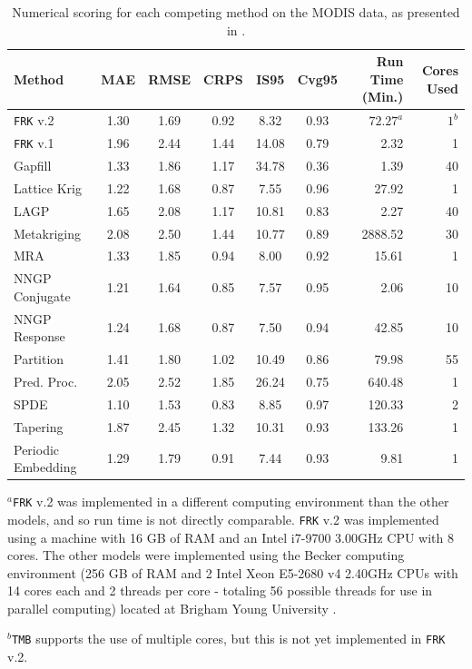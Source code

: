 \documentclass[12pt,a4paper]{article}
\newenvironment{tabnote}{\par\vspace{1mm}\footnotesize}{\par}
\begin{document}
\begin{table}[t!]
    \begin{center}
    \setlength{\tabcolsep}{5pt}
    \caption{Numerical scoring for each competing method on the MODIS data, as presented in \cite{Heaton_2019_comparative_study}.}
    \label{tab:Heaton_comparison}
    \begin{tabular}{lcccccrr}
    \hline
    \hline
    Method & MAE  & RMSE & CRPS & IS95 & Cvg95 & Run Time (Min.) & Cores Used \\[0pt]
    \hline
    \texttt{FRK} v.2 & 1.30  & 1.69 & 0.92  & 8.32 & 0.93 & $72.27^{a}$ & $1^{b}$    \\[0pt]
    \texttt{FRK} v.1 & 1.96   & 2.44 & 1.44  & 14.08 & 0.79 & 2.32 & 1\\[0pt]
    Gapfill & 1.33   & 1.86 & 1.17  & 34.78 & 0.36 & 1.39 & 40\\[0pt]
    Lattice Krig & 1.22   & 1.68 & 0.87  & 7.55 & 0.96 & 27.92 & 1\\[0pt]
    LAGP & 1.65   & 2.08 & 1.17  & 10.81 & 0.83 & 2.27 & 40\\[0pt]
    Metakriging  & 2.08 & 2.50  & 1.44 & 10.77 & 0.89 & 2888.52 & 30\\[0pt]
     MRA & 1.33 & 1.85 & 0.94 & 8.00 & 0.92 & 15.61 & 1\\[0pt]
    NNGP Conjugate & 1.21 & 1.64 & 0.85 & 7.57 & 0.95 & 2.06 & 10\\[0pt]
    NNGP Response & 1.24 & 1.68 & 0.87 & 7.50 & 0.94 & 42.85 & 10\\[0pt]
    Partition & 1.41 & 1.80 & 1.02 & 10.49 & 0.86 & 79.98 & 55 \\[0pt]
    Pred. Proc. & 2.05 & 2.52 & 1.85 & 26.24 & 0.75 & 640.48 & 1\\[0pt]
    SPDE & 1.10 & 1.53 & 0.83 & 8.85 & 0.97 & 120.33 & 2\\[0pt]
    Tapering & 1.87 & 2.45 & 1.32 & 10.31 & 0.93 & 133.26 & 1\\[0pt]
    Periodic Embedding & 1.29 & 1.79 & 0.91 & 7.44 & 0.93 & 9.81 & 1\\[0pt]
    \hline
    \hline
    \end{tabular}
    \end{center}
    \begin{tabnote}
$^{a}$\texttt{FRK} v.2 was implemented in a different computing environment than the other models, and so run time is not directly comparable. \texttt{FRK} v.2 was implemented using a machine with 16 GB of RAM and an Intel i7-9700 3.00GHz CPU with 8 cores. The other models were implemented using the Becker computing environment (256 GB of RAM and 2 Intel Xeon E5-2680 v4 2.40GHz CPUs with 14 cores each and 2 threads per core - totaling 56 possible threads for use in parallel computing) located at Brigham Young University \citep{Heaton_2019_comparative_study}.

$^{b}$\texttt{TMB} supports the use of multiple cores, but this is not yet implemented in \texttt{FRK} v.2. 
\end{tabnote}
\end{table}
\end{document}
